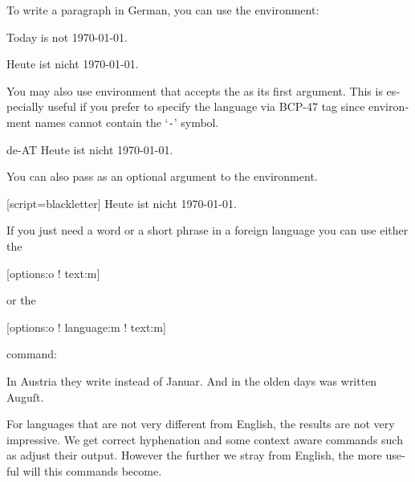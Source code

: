 To write a paragraph in German, you can use the  environment:

\begin{example}
\setdefaultlanguage{english}
Today is not \today.

\begin{german}
  Heute ist nicht \today.
\end{german}
\end{example}

You may also use  environment that accepts the  as its
first argument. This is especially useful if you prefer to specify the language
via BCP-47 tag since environment names cannot contain the
\enquote*{\texttt{-}} symbol.

\begin{example}
\begin{lang}{de-AT}
  Heute ist nicht \today.
\end{lang}
\end{example}

You can also pass  as an optional argument to the environment.

\begin{example}
\begin{german}[script=blackletter]
  Heute ist nicht \today.
\end{german}
\end{example}

If you just need a word or a short phrase in a foreign language you can use
either the
\begin{lscommand}
  [options:o ! text:m]
\end{lscommand}
or the
\begin{lscommand}
  [options:o ! language:m ! text:m]
\end{lscommand}
command:
\begin{example}[examplewidth=0.33\linewidth]
In Austria they write
instead of \textgerman{Januar}.
And in the olden days 
was written
\textgerman[script=blackletter]{Auguſt}.
\end{example}

For languages that are not very different from English, the results are not
very impressive. We get correct hyphenation and some context aware commands
such as  adjust their output. However the further we stray from
English, the more useful will this commands become.

